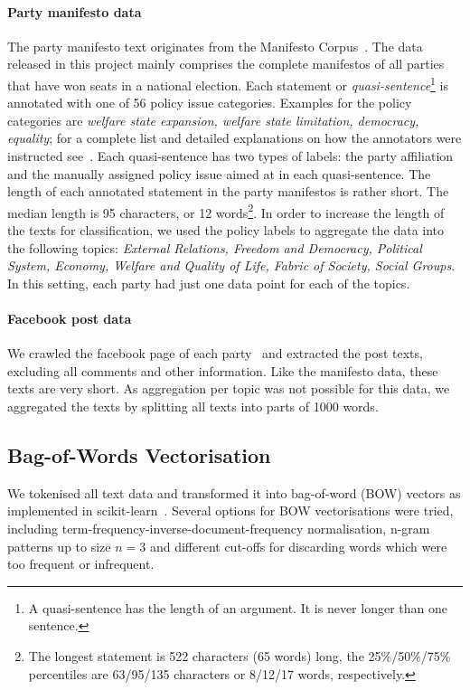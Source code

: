 \documentclass[11pt]{article}
\begin{document}
\paragraph{Party manifesto data}
The party manifesto text originates from the Manifesto Corpus~\cite{manifesto}. The data released in this project mainly comprises the complete manifestos of all parties that have won seats in a national election. Each statement or {\em quasi-sentence}\footnote{A quasi-sentence has the length of an argument. It is never longer than one sentence.} is annotated with one of 56 policy issue categories. Examples for the policy categories are {\em welfare state expansion, welfare state limitation, democracy, equality}; for a complete list and detailed explanations on how the annotators were instructed see~\cite{leftright}. Each quasi-sentence has two types of labels: the party affiliation and the manually assigned policy issue aimed at in each quasi-sentence. The length of each annotated statement in the party manifestos is rather short. The median length is 95 characters, or 12 words\footnote{The longest statement is 522 characters (65 words) long, the 25\%/50\%/75\% percentiles are 63/95/135 characters or 8/12/17 words, respectively.}. 
In order to increase the length of the texts for classification, we used the policy labels to aggregate the data into the following topics: {\em External Relations, Freedom and Democracy, Political System, Economy, Welfare and Quality of Life, Fabric of Society, Social Groups}. In this setting, each party had just one data point for each of the topics. 

\paragraph{Facebook post data}
We crawled the facebook page of each party~\cite{gruene-fb, spd-fb, cducsu-fb, linke-fb} and extracted the post texts, excluding all comments and other information. Like the manifesto data, these texts are very short. As aggregation per topic was not possible for this data, we aggregated the texts by splitting all texts into parts of 1000 words. 

\subsection{Bag-of-Words Vectorisation}\label{sec:bow-vectorization}
We tokenised all text data and transformed it into bag-of-word (BOW) vectors as implemented in scikit-learn~\cite{scikit-learn}. Several options for BOW vectorisations were tried, including term-frequency-inverse-document-frequency normalisation, n-gram patterns up to size $n=3$ and different cut-offs for discarding words which were too frequent or infrequent.
\end{document}

